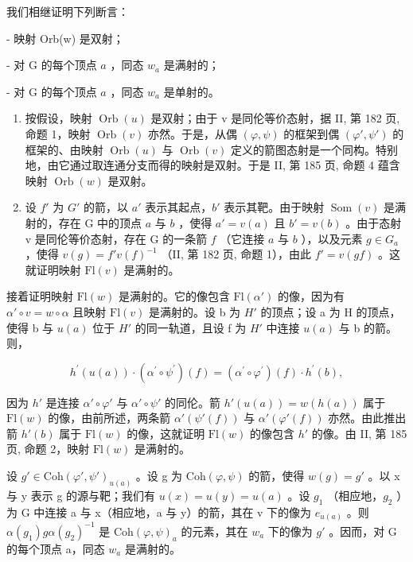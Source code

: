 我们相继证明下列断言：

- 映射 Orb(w) 是双射；

- 对 G 的每个顶点 \(a\) ，同态 \(w_{a}\) 是满射的；

- 对 G 的每个顶点 \(a\) ，同态 \(w_{a}\) 是单射的。

\begin{enumerate}
\def\labelenumi{\alph{enumi})}
\item
  按假设，映射 \(\operatorname{Orb}(u)\) 是双射；由于 v 是同伦等价态射，据 II, 第 182 页, 命题 1，映射 \(\operatorname{Orb}(v)\) 亦然。于是，从偶 \((\varphi,\psi)\) 的框架到偶 \((\varphi',\psi')\) 的框架的、由映射 \(\operatorname{Orb}(u)\) 与 \(\operatorname{Orb}(v)\) 定义的箭图态射是一个同构。特别地，由它通过取连通分支而得的映射是双射。于是 II, 第 185 页, 命题 4 蕴含映射 \(\operatorname{Orb}(w)\) 是双射。
\item
  设 \(f'\) 为 \(G'\) 的箭，以 \(a'\) 表示其起点，\(b'\) 表示其靶。由于映射 \(\operatorname{Som}(v)\) 是满射的，存在 G 中的顶点 \(a\) 与 \(b\) ，使得 \(a' = v(a)\) 且 \(b' = v(b)\) 。由于态射 v 是同伦等价态射，存在 G 的一条箭 \(f\) （它连接 \(a\) 与 \(b\) ），以及元素 \(g \in G_{a}\) ，使得 \(v(g) = f'v(f)^{-1}\) （II, 第 182 页, 命题 1），由此 \(f' = v(gf)\) 。这就证明映射 \(\mathrm{Fl}(v)\) 是满射的。
\end{enumerate}

接着证明映射 \(\mathrm{Fl}(w)\) 是满射的。它的像包含 \(\mathrm{Fl}(\alpha')\) 的像，因为有 \(\alpha'\circ v=w\circ\alpha\) 且映射 \(\mathrm{Fl}(v)\) 是满射的。设 b 为 \(H'\) 的顶点；设 a 为 H 的顶点，使得 b 与 \(u(a)\) 位于 \(H'\) 的同一轨道，且设 f 为 \(H'\) 中连接 \(u(a)\) 与 b 的箭。则，

\[
h ^ {\prime} (u (a)) \cdot (\alpha^ {\prime} \circ \psi^ {\prime}) (f) = (\alpha^ {\prime} \circ \varphi^ {\prime}) (f) \cdot h ^ {\prime} (b),
\]

因为 \(h'\) 是连接 \(\alpha' \circ \varphi'\) 与 \(\alpha' \circ \psi'\) 的同伦。箭 \(h'(u(a)) = w(h(a))\) 属于 \(\mathrm{Fl}(w)\) 的像，由前所述，两条箭 \(\alpha'(\psi'(f))\) 与 \(\alpha'(\varphi'(f))\) 亦然。由此推出箭 \(h'(b)\) 属于 \(\mathrm{Fl}(w)\) 的像，这就证明 \(\mathrm{Fl}(w)\) 的像包含 \(h'\) 的像。由 II, 第 185 页, 命题 2，映射 \(\mathrm{Fl}(w)\) 是满射的。

设 \(g' \in \mathrm{Coh}(\varphi', \psi')_{u(a)}\) 。设 g 为 \(\mathrm{Coh}(\varphi, \psi)\) 的箭，使得 \(w(g) = g'\) 。以 x 与 y 表示 g 的源与靶；我们有 \(u(x) = u(y) = u(a)\) 。设 \(g_1\) （相应地，\(g_2\) ）为 G 中连接 a 与 x（相应地，a 与 y）的箭，其在 v 下的像为 \(e_{u(a)}\) 。则 \(\alpha(g_1)g\alpha(g_2)^{-1}\) 是 \(\mathrm{Coh}(\varphi, \psi)_a\) 的元素，其在 \(w_a\) 下的像为 \(g'\) 。因而，对 G 的每个顶点 a，同态 \(w_a\) 是满射的。

